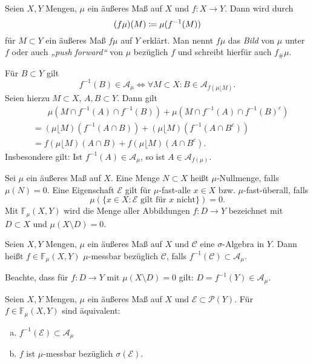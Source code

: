 \documentclass[a4paper,twoside,DIV15,BCOR12mm]{scrbook}
\newcommand{\A}{\mathcal A}
\newcommand{\MR}{\lfloor}
\begin{document}
\begin{definition}
Seien $X,Y$ Mengen, $\mu$ ein äußeres Maß auf $X$ und $f:X\to Y$. Dann wird durch
\[
(f\mu)(M) \da \mu(f^{-1}(M))
\]
für $M\subset Y$ ein äußeres Maß $f\mu$ auf $Y$ erklärt. Man nennt $f\mu$ das \emph{Bild} von $\mu$ unter $f$ oder auch \emph{„push forward“} von $\mu$ bezüglich $f$ und schreibt hierfür auch $f_\#\mu$.
\end{definition}

\begin{bemerkung}
Für $B\subset Y$ gilt
\[
f^{-1}(B) \in \A_\mu \iff \forall M\subset X: B \in \A_{f(\mu \MR M)}.
\]
Seien hierzu $M\subset X$, $A,B\subset Y$. Dann gilt
\begin{align*}
&\phantom{=\ \ }\mu(M\cap f^{-1}(A) \cap f^{-1}(B)) + \mu(M\cap f^{-1}(A) \cap f^{-1}(B)^c) \\
&= (\mu \MR M)(f^{-1}(A\cap B)) + (\mu \MR M)(f^{-1}(A\cap B^c)) \\
&= f(\mu \MR M)(A\cap B) + f(\mu \MR M) (A\cap B^c).
\end{align*}
Insbesondere gilt: Ist $f^{-1}(A) \in \A_\mu$, so ist $A\in\A_{f(\mu)}$.
\end{bemerkung}

\begin{sprechweisen}
Sei $\mu$ ein äußeres Maß auf $X$. Eine Menge $N\subset X$ heißt $\mu$-Nullmenge, falls $\mu(N)=0$. Eine Eigenschaft $\mathcal E$ gilt für $\mu$-fast-alle $x\in X$ bzw. $\mu$-fast-überall, falls 
\[
\mu(\{x\in X : \mathcal E\text{ gilt für $x$ nicht}\}) = 0.
\]
Mit $\mathbb F_\mu(X,Y)$ wird die Menge aller Abbildungen $f:D\to Y$ bezeichnet mit $D\subset X$ und $\mu(X\setminus D) = 0$.
\end{sprechweisen}

\begin{definition}
Seien $X,Y$ Mengen, $\mu$ ein äußeres Maß auf $X$ und $\mathcal C$ eine $\sigma$-Algebra in $Y$. Dann heißt $f\in\mathbb F_\mu(X,Y)$ $\mu$-messbar bezüglich $\mathcal C$, falls $f^{-1}(\mathcal C)\subset \A_\mu$.
\end{definition}

Beachte, dass für $f:D\to Y$ mit $\mu(X\setminus D)=0$ gilt: $D=f^{-1}(Y)\in \A_\mu$.

\begin{lemma}
Seien $X,Y$ Mengen, $\mu$ ein äußeres Maß auf $X$ und $\mathcal E\subset \mathcal P(Y)$.  Für $f\in\mathbb F_\mu(X,Y)$ sind äquivalent:
\begin{enumerate}[a)]
\item $f^{-1}(\mathcal E) \subset \A_\mu$
\item $f$ ist $\mu$-messbar bezüglich $\sigma(\mathcal E)$.
\end{enumerate}
\end{lemma}
\end{document}
